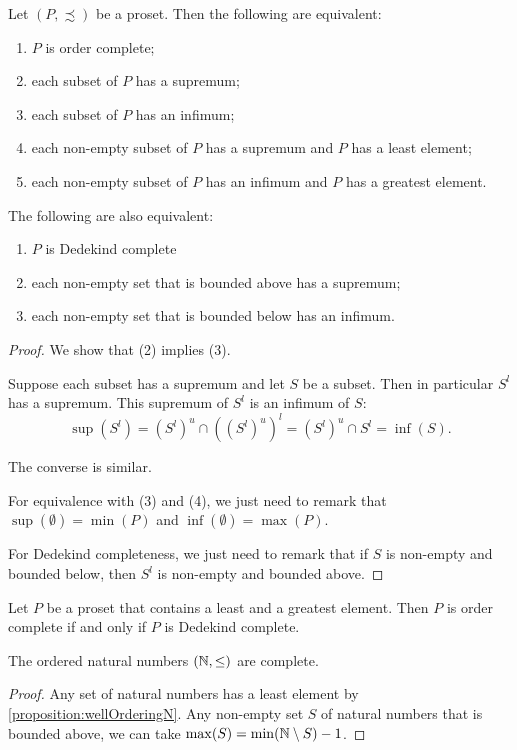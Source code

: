\begin{proposition} \label{prop:existenceSupremaInfima}
Let $(P,\precsim)$ be a proset. Then the following are equivalent:
\begin{enumerate}
\item $P$ is order complete;
\item each subset of $P$ has a supremum;
\item each subset of $P$ has an infimum;
\item each non-empty subset of $P$ has a supremum and $P$ has a least element;
\item each non-empty subset of $P$ has an infimum and $P$ has a greatest element.
\end{enumerate}
The following are also equivalent:
\begin{enumerate}
\item $P$ is Dedekind complete
\item each non-empty set that is bounded above has a supremum;
\item each non-empty set that is bounded below has an infimum.
\end{enumerate}
\end{proposition}
\begin{proof}
We show that (2) implies (3).

Suppose each subset has a supremum and let $S$ be a subset. Then in particular $S^l$ has a supremum. This supremum of $S^l$ is an infimum of $S$:
\[ \sup(S^l) = (S^l)^u\cap((S^l)^u)^l = (S^l)^u\cap S^l = \inf(S).  \]

The converse is similar.

For equivalence with (3) and (4), we just need to remark that $\sup(\emptyset) = \min(P)$ and $\inf(\emptyset) = \max(P)$.

For Dedekind completeness, we just need to remark that if $S$ is non-empty and bounded below, then $S^l$ is non-empty and bounded above.
\end{proof}

\begin{lemma}
Let $P$ be a proset that contains a least and a greatest element. Then $P$ is order complete \textup{if and only if} $P$ is Dedekind complete.
\end{lemma}

\begin{lemma}
The ordered natural numbers $(\mathbb{N},\leq)$ are complete.
\end{lemma}
\begin{proof}
Any set of natural numbers has a least element by \ref{proposition:wellOrderingN}. Any non-empty set $S$ of natural numbers that is bounded above, we can take $\max(S) = \min(\mathbb{N}\setminus S)-1$.
\end{proof}

